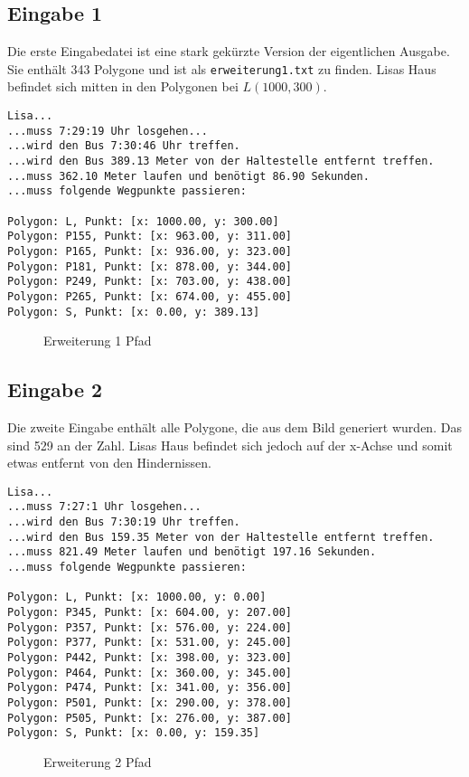 \documentclass[a4paper,10pt,ngerman]{scrartcl}
\begin{document}
\subsection{Eingabe 1}
Die erste Eingabedatei ist eine stark gekürzte Version der eigentlichen Ausgabe. Sie enthält 343 Polygone und ist als \texttt{erweiterung1.txt} zu finden. Lisas Haus befindet sich mitten in den Polygonen bei $L(1000, 300)$. 
\begin{verbatim}
Lisa...
...muss 7:29:19 Uhr losgehen...
...wird den Bus 7:30:46 Uhr treffen.
...wird den Bus 389.13 Meter von der Haltestelle entfernt treffen.
...muss 362.10 Meter laufen und benötigt 86.90 Sekunden.
...muss folgende Wegpunkte passieren:

Polygon: L, Punkt: [x: 1000.00, y: 300.00]
Polygon: P155, Punkt: [x: 963.00, y: 311.00]
Polygon: P165, Punkt: [x: 936.00, y: 323.00]
Polygon: P181, Punkt: [x: 878.00, y: 344.00]
Polygon: P249, Punkt: [x: 703.00, y: 438.00]
Polygon: P265, Punkt: [x: 674.00, y: 455.00]
Polygon: S, Punkt: [x: 0.00, y: 389.13]
\end{verbatim}
\begin{figure}[H]
  \def\svgwidth{\columnwidth} 
  
  \caption{Erweiterung 1 Pfad}
\end{figure}
\subsection{Eingabe 2}
Die zweite Eingabe enthält alle Polygone, die aus dem Bild generiert wurden. Das sind 529 an der Zahl. Lisas Haus befindet sich jedoch auf der x-Achse und somit etwas entfernt von den Hindernissen.
\begin{verbatim}
Lisa...
...muss 7:27:1 Uhr losgehen...
...wird den Bus 7:30:19 Uhr treffen.
...wird den Bus 159.35 Meter von der Haltestelle entfernt treffen.
...muss 821.49 Meter laufen und benötigt 197.16 Sekunden.
...muss folgende Wegpunkte passieren:

Polygon: L, Punkt: [x: 1000.00, y: 0.00]
Polygon: P345, Punkt: [x: 604.00, y: 207.00]
Polygon: P357, Punkt: [x: 576.00, y: 224.00]
Polygon: P377, Punkt: [x: 531.00, y: 245.00]
Polygon: P442, Punkt: [x: 398.00, y: 323.00]
Polygon: P464, Punkt: [x: 360.00, y: 345.00]
Polygon: P474, Punkt: [x: 341.00, y: 356.00]
Polygon: P501, Punkt: [x: 290.00, y: 378.00]
Polygon: P505, Punkt: [x: 276.00, y: 387.00]
Polygon: S, Punkt: [x: 0.00, y: 159.35]
\end{verbatim}
\begin{figure}[H]
  \def\svgwidth{\columnwidth} 
  
  \caption{Erweiterung 2 Pfad}
\end{figure}
\end{document}
